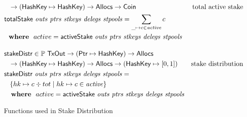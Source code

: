 \begin{figure}[htb]
\begin{align*}
      & ~~\to (\HashKey \mapsto \HashKey) \to \Allocs \to \Coin
      & \text{total active stake} \\
      & \fun{totalStake}~\var{outs}~\var{ptrs}~\var{stkeys}~\var{delegs}~\var{stpools} =
        \sum_{\_\mapsto c\in \var{active}}c \\
      & \where active = \activeStake{outs}{ptrs}{stkeys}{delegs}{stpools}
      \nextdef
      & \fun{stakeDistr} \in \powerset{\TxOut} \to (\Ptr \mapsto \HashKey) \to \Allocs\\
      & ~~\to (\HashKey \mapsto \HashKey) \to \Allocs \to (\HashKey \mapsto [0, 1])
      & \text{stake distribution} \\
      & \fun{stakeDistr}~\var{outs}~\var{ptrs}~\var{stkeys}~\var{delegs}~\var{stpools} = \\
      & ~~ \left\{ hk\mapsto c \div tot \mid hk \mapsto c \in \var{active} \right\}\\
      & ~\where active = \activeStake{outs}{ptrs}{stkeys}{delegs}{stpools}
  \end{align*}
  \caption{Functions used in Stake Distribution}
  \label{fig:functions:stake-distribution}
\end{figure}

